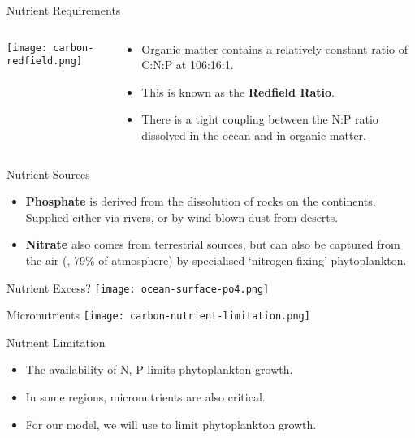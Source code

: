 \begin{frame}{Nutrient Requirements}
    \begin{columns}
        \begin{column}{0.4\linewidth}
            \texttt{[image: carbon-redfield.png]}
        \end{column}
        \begin{column}{0.5\linewidth}
            \begin{itemize}
                \item Organic matter contains a relatively constant ratio of C:N:P at 106:16:1.
                \item This is known as the \textbf{Redfield Ratio}.
                \item There is a tight coupling between the N:P ratio dissolved in the ocean and in organic matter.
            \end{itemize}
        \end{column}
    \end{columns}
\end{frame}

\begin{frame}{Nutrient Sources}
    \begin{itemize}
        \item \textbf{Phosphate} is derived from the dissolution of rocks on the continents. Supplied either via rivers, or by wind-blown dust from deserts.
        \item \textbf{Nitrate} also comes from terrestrial sources, but can also be captured from the air (, 79\% of atmosphere) by specialised `nitrogen-fixing' phytoplankton.
    \end{itemize} 
\end{frame}

\begin{frame}{Nutrient Excess?}
    \centering
    \texttt{[image: ocean-surface-po4.png]}
\end{frame}

\begin{frame}{Micronutrients}
    \centering
    \texttt{[image: carbon-nutrient-limitation.png]}
\end{frame}

\begin{frame}{Nutrient Limitation}

    \begin{itemize}
        \item The availability of N, P limits phytoplankton growth.
        \item In some regions, micronutrients are also critical.
        \item For our model, we will use  to limit phytoplankton growth.
    \end{itemize}

\end{frame}

